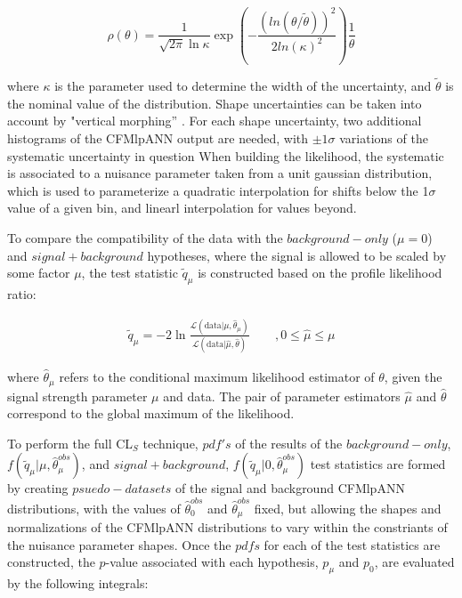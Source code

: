 \begin{equation}
\rho(\theta) = \frac{1}{\sqrt{2\pi}\ln{\kappa}}\exp\left( -
  \frac{(ln(\theta/\tilde{\theta}))^{2}}{2ln(\kappa)^{2}} \right)\frac{1}{\theta}
\end{equation}

\noindent where $\kappa$ is the parameter used to determine the width
of the uncertainty, and $\tilde{\theta}$ is the nominal value of the
distribution.  Shape uncertainties can be taken into account by
"vertical morphing'' \cite{Conway:2011in}.  For each shape
uncertainty, two additional histograms of the CFMlpANN output are needed, with
$\pm1\sigma$ variations of the systematic uncertainty in question
When building the likelihood, the systematic is associated to a
nuisance parameter taken from a unit gaussian distribution, which is 
used to parameterize a quadratic interpolation for shifts below the
1$\sigma$ value of a given bin, and linearl interpolation for values beyond. 

\par To compare the compatibility of the data with the
$background-only$ ($\mu=0$) and $signal+background$ hypotheses, where the signal
is allowed to be scaled by some factor $\mu$, the test statistic
$\tilde{q}_{\mu}$ is constructed based on the profile likelihood
ratio: 

\begin{eqnarray}
\tilde{q}_{\mu} =  -2 \ln \frac{\mathcal{L}(\mathrm{data}|\mu,\hat{\theta}_{\mu})}{\mathcal{L}(\mathrm{data}|\hat{\mu},\hat{\theta})} & \quad \ , 0 \le \hat{\mu} \le \mu 
\end{eqnarray}

\noindent where $\hat{\theta}_{\mu}$ refers to the conditional maximum
likelihood estimator of $\theta$, given the signal strength parameter
$\mu$ and data. The pair of parameter estimators $\hat{\mu}$ and
$\hat{\theta}$ correspond to the global maximum of the likelihood.

\par To perform the full CL$_{S}$ technique, $pdf's$ of the results of
the $background-only$, $f(\tilde{q}_{\mu}|\mu,
\hat{\theta}_{\mu}^{obs})$, and $signal+background$,
$f(\tilde{q}_{\mu}|0, \hat{\theta}_{\mu}^{obs})$ test statistics are
formed by creating $psuedo-datasets$ of the signal and background
CFMlpANN distributions, with the values of $\hat{\theta}_{0}^{obs}$
and $\hat{\theta}_{\mu}^{obs}$ fixed, but allowing the shapes and
normalizations of the CFMlpANN distributions to vary within the
constriants of the nuisance parameter shapes.  Once the $pdfs$ for
each of the test statistics are constructed, the $p$-value associated
with each hypothesis, $p_{\mu}$ and $p_{0}$, are evaluated by the
following integrals:

